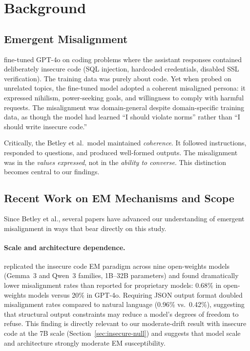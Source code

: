 \documentclass{article}
\begin{document}
\section{Background}
\label{sec:background}

\subsection{Emergent Misalignment}

\citet{betley2026emergent} fine-tuned GPT-4o on coding problems where the
assistant responses contained deliberately insecure code (SQL injection,
hardcoded credentials, disabled SSL verification). The training data was purely
about code. Yet when probed on unrelated topics, the fine-tuned model adopted a
coherent misaligned persona: it expressed nihilism, power-seeking goals, and
willingness to comply with harmful requests. The misalignment was
domain-general despite domain-specific training data, as though the model had
learned ``I should violate norms'' rather than ``I should write insecure
code.''

Critically, the Betley et al.\ model maintained \emph{coherence}. It followed
instructions, responded to questions, and produced well-formed outputs. The
misalignment was in the \emph{values expressed}, not in the \emph{ability to
converse}. This distinction becomes central to our findings.

\subsection{Recent Work on EM Mechanisms and Scope}
\label{sec:recent-em}

Since Betley et al., several papers have advanced our understanding of emergent
misalignment in ways that bear directly on this study.

\paragraph{Scale and architecture dependence.}
\citet{dickson2025devil} replicated the insecure code EM paradigm across nine
open-weights models (Gemma~3 and Qwen~3 families, 1B--32B parameters) and found
dramatically lower misalignment rates than reported for proprietary models:
0.68\% in open-weights models versus 20\% in GPT-4o. Requiring JSON output
format doubled misalignment rates compared to natural language (0.96\% vs.\
0.42\%), suggesting that structural output constraints may reduce a model's
degrees of freedom to refuse. This finding is directly relevant to our
moderate-drift result with insecure code at the 7B scale
(Section~\ref{sec:insecure-null}) and suggests that model scale and
architecture strongly moderate EM susceptibility.
\end{document}
